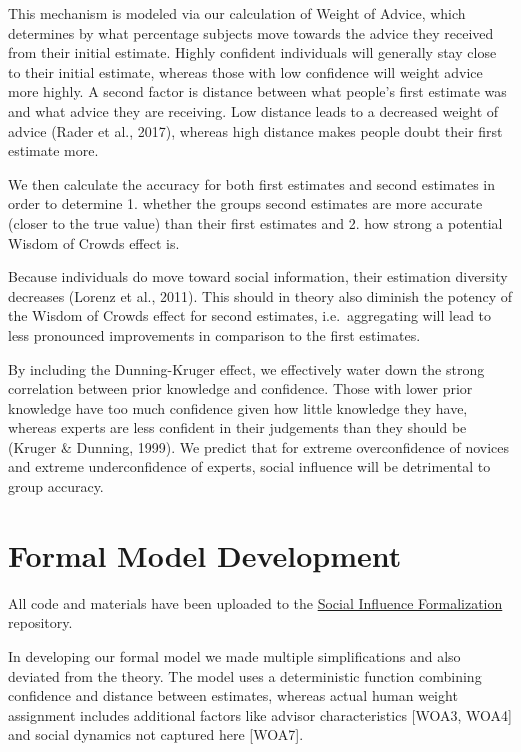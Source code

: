 \documentclass[
  man,floatsintext]{apa6}
\begin{document}
This mechanism is modeled via our calculation of Weight of Advice, which determines by what percentage subjects move towards the advice they received from their initial estimate. Highly confident individuals will generally stay close to their initial estimate, whereas those with low confidence will weight advice more highly. A second factor is distance between what people's first estimate was and what advice they are receiving. Low distance leads to a decreased weight of advice (Rader et al., 2017), whereas high distance makes people doubt their first estimate more.

We then calculate the accuracy for both first estimates and second estimates in order to determine 1. whether the groups second estimates are more accurate (closer to the true value) than their first estimates and 2. how strong a potential Wisdom of Crowds effect is.

Because individuals do move toward social information, their estimation diversity decreases (Lorenz et al., 2011). This should in theory also diminish the potency of the Wisdom of Crowds effect for second estimates, i.e.~aggregating will lead to less pronounced improvements in comparison to the first estimates.

By including the Dunning-Kruger effect, we effectively water down the strong correlation between prior knowledge and confidence. Those with lower prior knowledge have too much confidence given how little knowledge they have, whereas experts are less confident in their judgements than they should be (Kruger \& Dunning, 1999). We predict that for extreme overconfidence of novices and extreme underconfidence of experts, social influence will be detrimental to group accuracy.

\hypertarget{formal-model-development}{%
\section{Formal Model Development}\label{formal-model-development}}

All code and materials have been uploaded to the \href{https://github.com/th8m0z/social_influence_formalization}{Social Influence Formalization} repository.

In developing our formal model we made multiple simplifications and also deviated from the theory. The model uses a deterministic function combining confidence and distance between estimates, whereas actual human weight assignment includes additional factors like advisor characteristics {[}WOA3, WOA4{]} and social dynamics not captured here {[}WOA7{]}.
\end{document}
